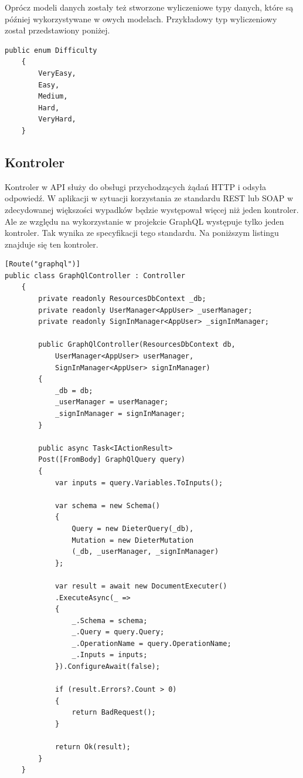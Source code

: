 Oprócz modeli danych zostały też stworzone wyliczeniowe typy danych, które są później wykorzystywane w owych modelach. Przykładowy typ wyliczeniowy został przedstawiony poniżej.

\begin{lstlisting}[language={[Sharp]C}]
 public enum Difficulty
    {
        VeryEasy,
        Easy,
        Medium,
        Hard,
        VeryHard,
    }
\end{lstlisting}

\subsection{Kontroler}
Kontroler w API służy do obsługi przychodzących żądań HTTP i odsyła odpowiedź. W aplikacji w sytuacji korzystania ze standardu REST lub SOAP w zdecydowanej większości wypadków będzie występował więcej niż jeden kontroler. Ale ze względu na wykorzystanie w projekcie GraphQL występuje tylko jeden kontroler. Tak wynika ze specyfikacji tego standardu.\cite{gqlcode} Na poniższym listingu znajduje się ten kontroler.
\begin{lstlisting}[language={[Sharp]C}]
[Route("graphql")]
public class GraphQlController : Controller
    {
        private readonly ResourcesDbContext _db;
        private readonly UserManager<AppUser> _userManager;
        private readonly SignInManager<AppUser> _signInManager;

        public GraphQlController(ResourcesDbContext db,
            UserManager<AppUser> userManager,
            SignInManager<AppUser> signInManager)
        {
            _db = db;
            _userManager = userManager;
            _signInManager = signInManager;
        }

        public async Task<IActionResult> 
        Post([FromBody] GraphQlQuery query)
        {
            var inputs = query.Variables.ToInputs();

            var schema = new Schema()
            {
                Query = new DieterQuery(_db),
                Mutation = new DieterMutation
                (_db, _userManager, _signInManager)
            };

            var result = await new DocumentExecuter()
            .ExecuteAsync(_ =>
            {
                _.Schema = schema;
                _.Query = query.Query;
                _.OperationName = query.OperationName;
                _.Inputs = inputs;
            }).ConfigureAwait(false);

            if (result.Errors?.Count > 0)
            {
                return BadRequest();
            }

            return Ok(result);
        }
    }
\end{lstlisting}

